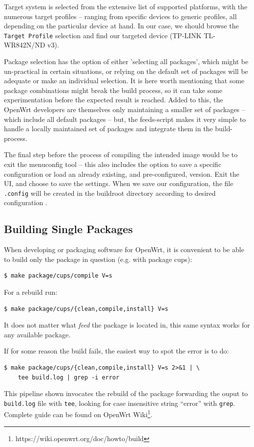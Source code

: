 Target system is selected from the extensive list of supported platforms, with the numerous target profiles – ranging from specific devices to generic profiles, all depending on the particular device at hand.
In our case, we should browse the {\tt Target Profile} selection and find our targeted device (TP-LINK TL-WR842N/ND v3).

Package selection has the option of either 'selecting all packages', which might be un-practical in certain situations, or relying on the default set of packages will be adequate or make an individual selection.
It is here worth mentioning that some package combinations might break the build process, so it can take some experimentation before the expected result is reached.
Added to this, the OpenWrt developers are themselves only maintaining a smaller set of packages – which include all default packages – but, the feeds-script makes it very simple to handle a locally maintained set of packages and integrate them in the build-process.

The final step before the process of compiling the intended image would be to exit the menuconfig tool – this also includes the option to save a specific configuration or load an already existing, and pre-configured, version.
Exit the UI, and choose to save the settings.
When we save our configuration, the file {\tt .config} will be created in the buildroot directory according to desired configuration \cite{build_owrt}.



\subsection{Building Single Packages}

When developing or packaging software for OpenWrt, it is convenient to be able to build only the package in question (e.g. with package cups):
\begin{lstlisting}[columns=fixed,basicstyle=\ttfamily\footnotesize,tabsize=4,backgroundcolor=\color{yellow!10}]
$ make package/cups/compile V=s
\end{lstlisting}
For a rebuild run:
\begin{lstlisting}[columns=fixed,basicstyle=\ttfamily\footnotesize,tabsize=4,backgroundcolor=\color{yellow!10}]
$ make package/cups/{clean,compile,install} V=s
\end{lstlisting}
It does not matter what {\it feed} the package is located in, this same syntax works for any available package.

If for some reason the build fails, the easiest way to spot the error is to do:
\begin{lstlisting}[columns=fixed,basicstyle=\ttfamily\footnotesize,tabsize=4,backgroundcolor=\color{yellow!10}]
$ make package/cups/{clean,compile,install} V=s 2>&1 | \
    tee build.log | grep -i error
\end{lstlisting}
This pipeline shown invocates the rebuild of the package forwarding the ouput to {\tt build.log} file with {\tt tee}, looking for case insensitive string “error” with {\tt grep}.
Complete guide can be found on OpenWrt Wiki\footnote{https://wiki.openwrt.org/doc/howto/build}.
